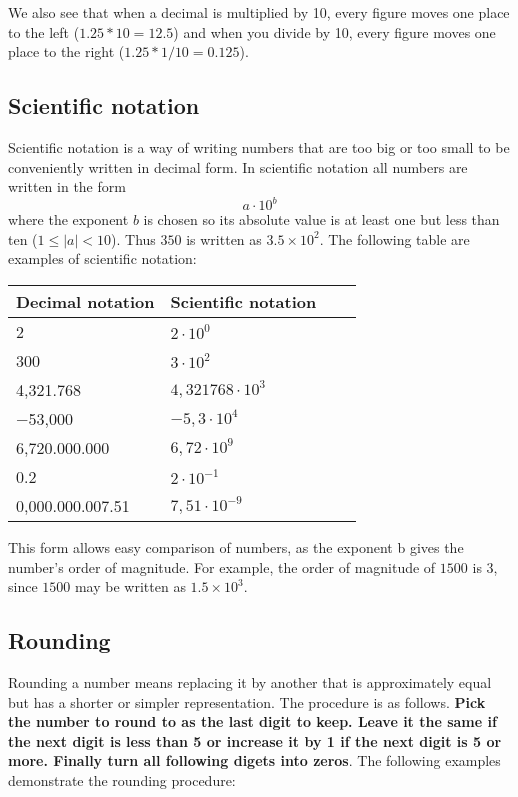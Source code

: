 We also see that when a decimal is multiplied by 10, every figure moves one place to the left ($1.25 * 10 = 12.5$) and when you divide by 10, every figure moves one place to the right ($1.25 * 1/10 = 0.125$).

\subsection{Scientific notation}
Scientific notation is a way of writing numbers that are too big or too small to be conveniently written in decimal form. In scientific notation all numbers are written in the form
\[
a \cdot 10^b
\]
where the exponent $b$ is chosen so its absolute value is at least one but less than ten ($1 ≤ |a| < 10$). Thus $350$ is written as $3.5×10^2$. The following table are examples of scientific notation:
\begin{table}[H]
\begin{tabular}{|l|l|l|l|}
\hline
\textbf{Decimal notation}   & \textbf{Scientific notation} \\ \hline
2                           & $2 \cdot 10^0$               \\ \hline
300                         & $3 \cdot 10^2$               \\ \hline
4,321.768                   & $4,321768 \cdot 10^3$        \\ \hline
−53,000                     & $−5,3 \cdot 10^4$            \\ \hline
6,720.000.000	              & $6,72 \cdot 10^9$            \\ \hline
0.2	                       & $2 \cdot 10^{−1}$            \\ \hline
0,000.000.007.51	           & $7,51 \cdot 10^{−9}$         \\ \hline
\end{tabular}
\end{table}
This form allows easy comparison of numbers, as the exponent b gives the number's order of magnitude. For example, the order of magnitude of $1500$ is $3$, since $1500$ may be written as $1.5 × 10^3$.

\subsection{Rounding}
Rounding a number means replacing it by another that is approximately equal but has a shorter or simpler representation. The procedure is as follows. \textbf{Pick the number to round to as the last digit to keep. Leave it the same if the next digit is less than 5 or increase it by 1 if the next digit is 5 or more. Finally turn all following digets into zeros}. The following examples demonstrate the rounding procedure:

